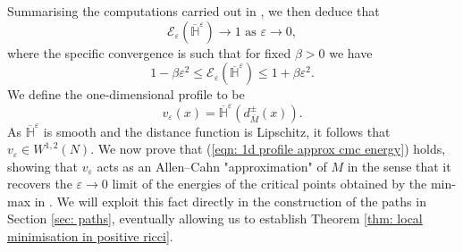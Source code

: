 \documentclass[11pt]{article}
\begin{document}
Summarising the computations carried out in \cite[Section 2.2]{bellettini}, we then deduce that
\begin{equation}\label{eqn: 1d energy approx 1}
    \mathcal{E}_\varepsilon (\overline{\mathbb{H}}^\varepsilon) \rightarrow 1 \text{ as } \varepsilon \rightarrow 0,
\end{equation}
where the specific convergence is such that for fixed $\beta > 0$ we have
\begin{equation}\label{eqn: 1d solution errors in eps^2}
   1 - \beta \varepsilon^2 \leq \mathcal{E}_\varepsilon(\overline{\mathbb{H}}^\varepsilon) \leq 1 + \beta \varepsilon^2.
\end{equation}
We define the one-dimensional profile to be
\begin{equation*}
v_\varepsilon (x) =
\overline{\mathbb{H}}^\varepsilon ( d^\pm_{\overline{M}}(x)).
\end{equation*}
As $\overline{\mathbb{H}}^\varepsilon$ is smooth and the distance function is Lipschitz, it follows that $v_\varepsilon \in W^{1,2}(N)$. We now prove that (\ref{eqn: 1d profile approx cmc energy}) holds,
showing that $v_\varepsilon$ acts as an Allen--Cahn "approximation" of $M$ in the sense that it recovers the $\varepsilon \rightarrow 0$ limit of the energies of the critical points obtained by the min-max in \cite{bellettini-wickramasekera}. We will exploit this fact directly in the construction of the paths in Section \ref{sec: paths}, eventually allowing us to establish Theorem \ref{thm: local minimisation in positive ricci}.

\bigskip
\end{document}
